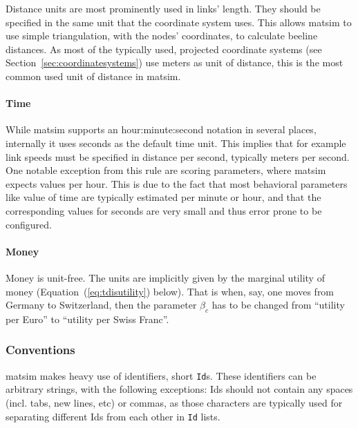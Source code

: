 Distance units are most prominently used in links' length. They should be specified in the same unit that the coordinate system uses. This allows \gls{matsim} to use simple triangulation, \eg with the nodes' coordinates, to calculate beeline distances. As most of the typically used, projected coordinate systems (see Section~\ref{sec:coordinatesystems}) use meters as unit of distance, this is the most common used unit of distance in \gls{matsim}. 

\paragraph{Time}

While \gls{matsim} supports an hour:minute:second notation in several places, internally it uses seconds as the default time unit. This implies that for example link speeds must be specified in distance per second, typically meters per second. One notable exception from this rule are scoring parameters, where \gls{matsim} expects values per hour. This is due to the fact that most behavioral parameters like value of time are typically estimated per minute or hour, and that the corresponding values for seconds are very small and thus error prone to be configured. 

\paragraph{Money}

Money is unit-free. The units are implicitly given by the marginal utility of money (\cf Equation~(\ref{eq:tdisutility}) below). That is when, say, one moves from Germany to Switzerland, then the parameter $\beta_c$ has to be changed from ``utility per Euro'' to ``utility per Swiss Franc''.

\subsubsection{Conventions}
\gls{matsim} makes heavy use of identifiers, short \lstinline|Id|s. These identifiers can be arbitrary strings, with the following exceptions: Ids should not contain any spaces (incl. tabs, new lines, etc) or commas, as those characters are typically used for separating different Ids from each other in \lstinline|Id| lists. 

